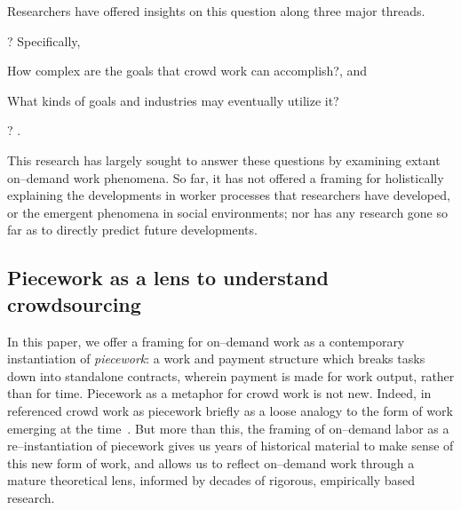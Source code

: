 \documentclass[trackingWork]{subfiles}
\begin{document}
Researchers have offered insights on this question along three major threads.
\begin{Numberlist}[itemjoin*={.~And~},itemjoin={.~}]
  \item {}?
        Specifically,
        \begin{inlinelist}[label=(\alph*)]
          \item How complex are the goals that crowd work can accomplish?, and
          \item What kinds of goals and industries may eventually utilize it?
        \end{inlinelist}
        \cite{foundry,suzukiAtelier,KimStoria,yuanAlmost,YuEncouragingOutside,
              Nebeling:2016:WCW:2858036.2858169,
              Hahn:2016:KAB:2858036.2858364}
  \item {}
        \cite{embracingErrorKrishna,bernsteinSoylent,sensitiveTasks,
              LykourentzouPersonalityMatters,KucherbaevReLauncher,
              Law:2016:CKC:2858036.2858144,Cai:2016:CRI:2858036.2858237,
              Chang:2016:ACC:2858036.2858411,Newell:2016:OMA:2858036.2858490}
  \item {}?
        \cite{turkopticon,storiesIraniSilberman,dynamo,crowdcollab,
              whyWouldAnyoneBrewer,takingAHITMcInnis}.
\end{Numberlist}

This research has largely sought to answer these questions by examining extant on--demand work phenomena.
So far, it has not offered a framing for holistically explaining
the developments in worker processes that researchers have developed, or
the emergent phenomena in social environments;
nor has any research
gone so far as to directly predict future developments.

\subsection{Piecework as a lens to understand crowdsourcing}
In this paper, we offer a framing for on--demand work as a contemporary instantiation of \textit{piecework}: %
a work and payment structure which breaks tasks down into standalone contracts,
wherein payment is made for work output, rather than for time.
Piecework as a metaphor for crowd work is not new.
Indeed,
\citeauthor{crowdworkFuture} in \citeyear{crowdworkFuture}
referenced crowd work as piecework briefly
as a loose analogy to the form of work emerging at the time~\cite{crowdworkFuture}.
But more than this,
the framing of on--demand labor as a re--instantiation of piecework
gives us years of historical material to make sense of this new form of work, and allows us to reflect on--demand work through a mature theoretical lens, informed by decades of rigorous, empirically based research.
\end{document}
